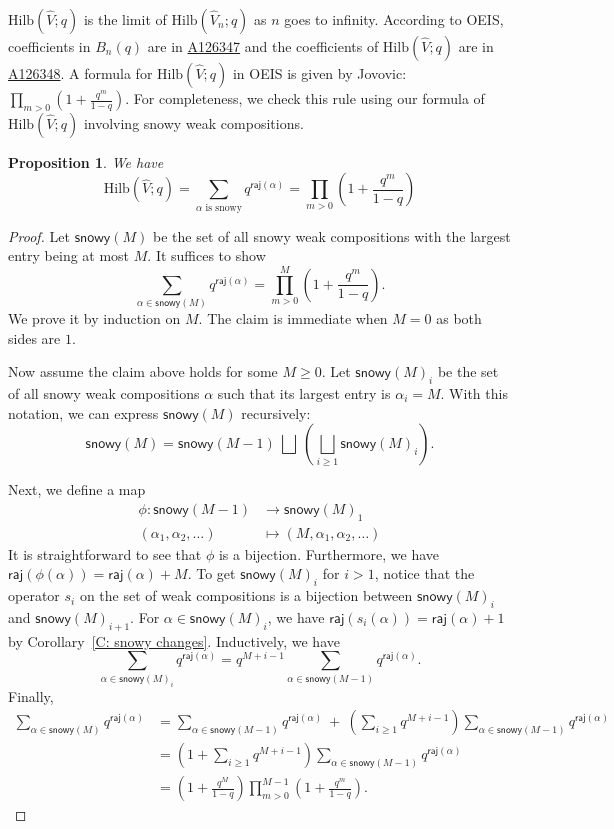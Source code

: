 \documentclass[10pt]{amsart}
\theoremstyle{plain}
\theoremstyle{plain}
\theoremstyle{definition}
\theoremstyle{definition}
\theoremstyle{definition}
\theoremstyle{plain}
\theoremstyle{plain}
\theoremstyle{plain}
\theoremstyle{plain}
\newtheorem{prop}[prop]{Proposition}
\theoremstyle{plain}
\theoremstyle{remark}
\theoremstyle{remark}
\theoremstyle{plain}
\theoremstyle{plain}
\newcommand{\raj}{\mathsf{raj}}
\newcommand{\Hilb}{\mathrm{Hilb}}
\begin{document}
 $\Hilb(\widehat{V};q)$ is the limit of $\Hilb(\widehat{V}_n;q)$
as $n$ goes to infinity. 
According to OEIS, 
coefficients in $B_n(q)$ are in \href{https://oeis.org/A126347}{A126347} and 
the coefficients of $\Hilb(\widehat{V};q)$ are in \href{https://oeis.org/A126348}{A126348}. 
A formula for $\Hilb(\widehat{V};q)$ in OEIS is given by Jovovic: 
$\prod_{m > 0} (1 + \frac{q^m}{1 - q})$.
For completeness, we check this rule using our formula
of $\Hilb(\widehat{V};q)$ involving snowy weak compositions.

\begin{prop}\label{T: F}
We have
$$\Hilb(\widehat{V};q) = \sum_{\alpha \text{ is snowy}} q^{\raj(\alpha)}
= \prod_{m > 0} \left( 1 + \frac{q^m}{1 - q} \right)
$$
\end{prop}

\begin{proof}
Let $\mathsf{snowy}(M)$ be the set of all snowy weak compositions
with the largest entry being at most $M$.
It suffices to show 
$$ \sum_{\alpha \in \mathsf{snowy}(M)} q^{\raj(\alpha)}=\prod_{m  > 0}^M\left(1 + \frac{q^m}{1 - q}\right).$$ 
We prove it by induction on $M$. The claim is immediate when $M = 0$ as both sides are $1$.

Now assume the claim above holds for some $M\geq 0$.
Let $\mathsf{snowy}(M)_i$ be the set of all snowy weak compositions
$\alpha$ such that its largest entry is $\alpha_i = M$.
With this notation, we can express $\mathsf{snowy}(M)$ recursively:
$$\mathsf{snowy}(M) = \mathsf{snowy}(M-1) \:\bigsqcup\: \left( \bigsqcup_{i \geq 1} \mathsf{snowy}(M)_i\right).$$

Next, we define a map
\begin{align*}
    \phi: \mathsf{snowy}(M-1) &\to \mathsf{snowy}(M)_1 \\
    (\alpha_1, \alpha_2, \dots) &\mapsto (M, \alpha_1, \alpha_2, \dots)
\end{align*}
It is straightforward to see that $\phi$ is a bijection.
Furthermore, we have $\raj(\phi(\alpha)) = \raj(\alpha) + M$.
To get $\mathsf{snowy}(M)_i$ for $i>1$, notice that 
the operator $s_i$ on the set of weak compositions is a 
bijection between $\mathsf{snowy}(M)_i$
and $\mathsf{snowy}(M)_{i+1}$.
For $\alpha \in \mathsf{snowy}(M)_i$, we have
$\raj(s_i(\alpha)) = \raj(\alpha) + 1$ 
by Corollary~\ref{C: snowy changes}.
Inductively, we have
$$
\sum_{\alpha \in \mathsf{snowy}(M)_i} q^{\raj(\alpha)}
= q^{M+i - 1}\sum_{\alpha \in \mathsf{snowy}(M-1)} q^{\raj(\alpha)}.
$$
Finally, 
\begin{align*}
\sum_{\alpha \in \mathsf{snowy}(M)} q^{\raj(\alpha)} & =
\sum_{\alpha \in \mathsf{snowy}(M-1)} q^{\raj(\alpha)}
\:+\: \left(\sum_{i \geq 1}q^{M+i-1}\right) \sum_{\alpha \in \mathsf{snowy}(M-1)} q^{\raj(\alpha)}\\
& = 
\left(1 + \sum_{i \geq 1}q^{M+i-1} \right) \sum_{\alpha \in \mathsf{snowy}(M-1)} q^{\raj(\alpha)} \\
& = \left(1+\frac{q^M}{1-q}\right)\prod_{m  > 0}^{M-1}\left(1 + \frac{q^m}{1 - q}\right).
\end{align*}
\end{proof}
\end{document}
